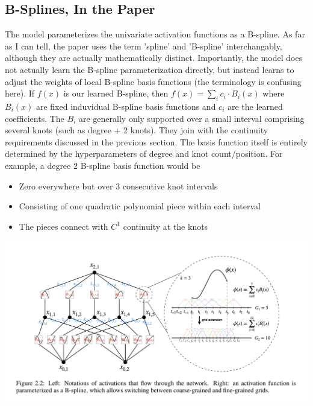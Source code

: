 \documentclass{article}
\begin{document}
\subsection{B-Splines, In the Paper}
The model parameterizes the univariate activation functions as a B-spline. As far as I can tell, the paper uses the term 'spline' and 'B-spline' interchangably, although they are actually mathematically distinct. Importantly, the model does not actually learn the B-spline parameterization directly, but instead learns to adjust the weights of local B-spline basis functions (the terminology is confusing here). If $f(x)$ is our learned B-spline, then $f(x) = \sum_{i} c_i \cdot B_i(x)$ where $B_i(x)$ are fixed induvidual B-spline basis functions and $c_i$ are the learned coefficients. The $B_i$ are generally only supported over a small interval comprising several knots (such as degree + 2 knots). They join with the continuity requirements discussed in the previous section. The basis function itself is entirely determined by the hyperparameters of degree and knot count/position. For example, a degree $2$ B-spline basis function would be
\begin{itemize}
\item Zero everywhere but over 3 consecutive knot intervals
\item Consisting of one quadratic polynomial piece within each interval
\item The pieces connect with $C^1$ continuity at the knots
\end{itemize}
\includegraphics[scale = 0.5]{figure1.png}
\end{document}

